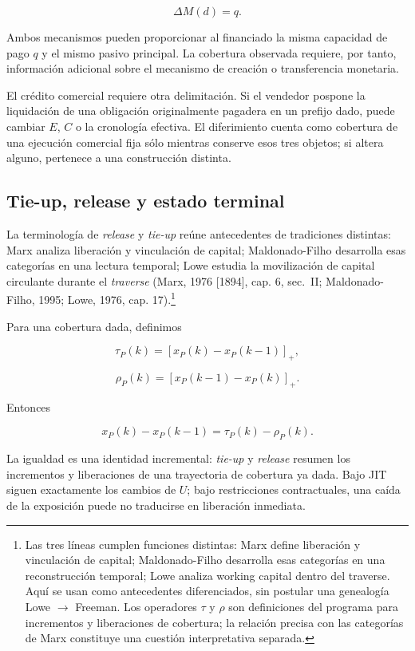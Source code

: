 \documentclass[10pt,a5paper,twoside]{article}
\begin{document}
\[
\Delta M(d)=q.
\]

Ambos mecanismos pueden proporcionar al financiado la misma capacidad de
pago \(q\) y el mismo pasivo principal. La cobertura observada requiere, por tanto, información adicional sobre el
mecanismo de creación o transferencia monetaria.

El crédito comercial requiere otra delimitación. Si el vendedor pospone la
liquidación de una obligación originalmente pagadera en un prefijo dado,
puede cambiar \(E\), \(C\) o la cronología efectiva. El diferimiento cuenta
como cobertura de una ejecución comercial fija sólo mientras conserve esos
tres objetos; si altera alguno, pertenece a una construcción distinta.

\subsection{Tie-up, release y estado terminal}\label{tie-up-release-y-estado-terminal}

La terminología de \emph{release} y \emph{tie-up} reúne antecedentes de
tradiciones distintas: Marx analiza liberación y vinculación de capital;
Maldonado-Filho desarrolla esas categorías en una lectura temporal; Lowe
estudia la movilización de capital circulante durante el \emph{traverse} (Marx, 1976 {[}1894{]}, cap. 6, sec.~II;
Maldonado-Filho, 1995; Lowe, 1976, cap. 17).\footnote{Las tres líneas
  cumplen funciones distintas: Marx define liberación y vinculación de
  capital; Maldonado-Filho desarrolla esas categorías en una
  reconstrucción temporal; Lowe analiza working capital dentro del
  traverse. Aquí se usan como antecedentes diferenciados, sin postular una
  genealogía Lowe \(\to\) Freeman. Los operadores \(\tau\) y \(\rho\)
  son definiciones del programa para incrementos y liberaciones de
  cobertura; la relación precisa con las categorías de Marx constituye
  una cuestión interpretativa separada.}

Para una cobertura dada, definimos

\[
\tau_P(k)
=
[x_P(k)-x_P(k-1)]_+,
\]

\[
\rho_P(k)
=
[x_P(k-1)-x_P(k)]_+.
\]

Entonces

\[
x_P(k)-x_P(k-1)
=
\tau_P(k)-\rho_P(k).
\]

La igualdad es una identidad incremental: \emph{tie-up} y \emph{release}
resumen los incrementos y liberaciones de una trayectoria de cobertura ya
dada. Bajo JIT siguen exactamente los cambios de \(U\); bajo restricciones
contractuales, una caída de la exposición puede no traducirse en liberación
inmediata.
\end{document}
